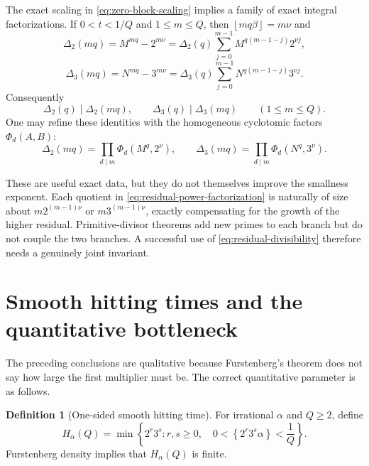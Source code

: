 \documentclass[11pt]{article}
\theoremstyle{definition}
\newtheorem{definition}[theorem]{Definition}
\theoremstyle{remark}
\newcommand{\fract}[1]{\left\{#1\right\}}
\newcommand{\floor}[1]{\left\lfloor#1\right\rfloor}
\begin{document}
The exact scaling in \eqref{eq:zero-block-scaling} implies a family of exact
integral factorizations.  If $0<t<1/Q$ and $1\le m\le Q$, then
$\floor{mq\beta}=m\nu$ and
\begin{equation}\label{eq:residual-power-factorization}
 \Delta_2(mq)=M^{mq}-2^{m\nu}
 =\Delta_2(q)\sum_{j=0}^{m-1}M^{q(m-1-j)}2^{\nu j},
\end{equation}
\begin{equation}\label{eq:residual-power-factorization-three}
 \Delta_3(mq)=N^{mq}-3^{m\nu}
 =\Delta_3(q)\sum_{j=0}^{m-1}N^{q(m-1-j)}3^{\nu j}.
\end{equation}
Consequently
\begin{equation}\label{eq:residual-divisibility}
 \Delta_2(q)\mid\Delta_2(mq),
 \qquad
 \Delta_3(q)\mid\Delta_3(mq)
 \qquad(1\le m\le Q).
\end{equation}
One may refine these identities with the homogeneous cyclotomic factors
$\Phi_d(A,B)$:
\begin{equation}\label{eq:cyclotomic-residual}
 \Delta_2(mq)=\prod_{d\mid m}\Phi_d(M^q,2^\nu),
 \qquad
 \Delta_3(mq)=\prod_{d\mid m}\Phi_d(N^q,3^\nu).
\end{equation}

These are useful exact data, but they do not themselves improve the smallness
exponent.  Each quotient in \eqref{eq:residual-power-factorization} is naturally of
size about $m2^{(m-1)\nu}$ or $m3^{(m-1)\nu}$, exactly compensating for the growth of
the higher residual.  Primitive-divisor theorems add new primes to each branch but
do not couple the two branches.  A successful use of
\eqref{eq:residual-divisibility} therefore needs a genuinely joint invariant.

\section{Smooth hitting times and the quantitative bottleneck}
\label{sec:hitting-times}

The preceding conclusions are qualitative because Furstenberg's theorem does not
say how large the first multiplier must be.  The correct quantitative parameter is
as follows.

\begin{definition}[One-sided smooth hitting time]\label{def:hitting-time}
For irrational $\alpha$ and $Q\ge2$, define
\begin{equation}\label{eq:hitting-time}
 H_\alpha(Q)=\min\left\{2^r3^s:
 r,s\ge0,\quad 0<\fract{2^r3^s\alpha}<\frac1Q\right\}.
\end{equation}
Furstenberg density implies that $H_\alpha(Q)$ is finite.
\end{definition}
\end{document}
